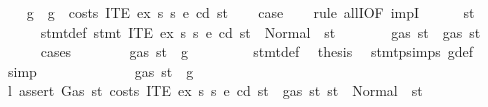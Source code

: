 \begin{isabellebody}
\ \ \isamarkupfalse%
\ g\ \ {\isachardoublequoteopen}g\ {\isacharequal}{\kern0pt}\ costs\ {\isacharparenleft}{\kern0pt}ITE\ ex\ s{}\ s{}{\isacharparenright}{\kern0pt}\ e\ cd\ st{\isachardoublequoteclose}\isanewline
\ \ \isamarkupfalse%
\ {\isacharquery}{\kern0pt}case\isanewline
\ \ \isamarkupfalse%
\ {\isacharparenleft}{\kern0pt}rule\ allI{\isacharbrackleft}{\kern0pt}OF\ impI{\isacharbrackright}{\kern0pt}{\isacharparenright}{\kern0pt}\isanewline
\ \ \ \ \isamarkupfalse%
\ st{}{\isacharprime}{\kern0pt}\isanewline
\ \ \ \ \isamarkupfalse%
\ stmt{\isacharunderscore}{\kern0pt}def{\isacharcolon}{\kern0pt}\ {\isachardoublequoteopen}stmt\ {\isacharparenleft}{\kern0pt}ITE\ ex\ s{}\ s{}{\isacharparenright}{\kern0pt}\ e\ cd\ st\ {\isacharequal}{\kern0pt}\ Normal\ {\isacharparenleft}{\kern0pt}{\isacharparenleft}{\kern0pt}{\isacharparenright}{\kern0pt}{\isacharcomma}{\kern0pt}\ st{}{\isacharprime}{\kern0pt}{\isacharparenright}{\kern0pt}{\isachardoublequoteclose}\isanewline
\ \ \ \ \isamarkupfalse%
\ \isamarkupfalse%
\ {\isachardoublequoteopen}gas\ st{}{\isacharprime}{\kern0pt}\ {\isasymle}\ gas\ st{\isachardoublequoteclose}\isanewline
\ \ \ \ \isamarkupfalse%
\ cases\isanewline
\ \ \ \ \ \ \isamarkupfalse%
\ {\isachardoublequoteopen}gas\ st\ {\isasymle}\ g{\isachardoublequoteclose}\isanewline
\ \ \ \ \ \ \isamarkupfalse%
\ {}{\isacharparenleft}{\kern0pt}{}{\isacharparenright}{\kern0pt}\ stmt{\isacharunderscore}{\kern0pt}def\ \isamarkupfalse%
\ {\isacharquery}{\kern0pt}thesis\ \isamarkupfalse%
\ stmt{\isachardot}{\kern0pt}psimps{\isacharparenleft}{\kern0pt}{}{\isacharparenright}{\kern0pt}\ g{\isacharunderscore}{\kern0pt}def\ \isamarkupfalse%
\ simp\isanewline
\ \ \ \ \isamarkupfalse%
\isanewline
\ \ \ \ \ \ \isamarkupfalse%
\ {\isachardoublequoteopen}{\isasymnot}\ gas\ st\ {\isasymle}\ g{\isachardoublequoteclose}\isanewline
\ \ \ \ \ \ \isamarkupfalse%
\ \isamarkupfalse%
\ l{}{\isacharcolon}{\kern0pt}\ {\isachardoublequoteopen}assert\ Gas\ {\isacharparenleft}{\kern0pt}{\isasymlambda}st{\isachardot}{\kern0pt}\ costs\ {\isacharparenleft}{\kern0pt}ITE\ ex\ s{}\ s{}{\isacharparenright}{\kern0pt}\ e\ cd\ st\ {\isacharless}{\kern0pt}\ gas\ st{\isacharparenright}{\kern0pt}\ st\ {\isacharequal}{\kern0pt}\ Normal\ {\isacharparenleft}{\kern0pt}{\isacharparenleft}{\kern0pt}{\isacharparenright}{\kern0pt}{\isacharcomma}{\kern0pt}\ st{\isacharparenright}{\kern0pt}\ {\isachardoublequoteclose}\ \isamarkupfalse%

\end{isabellebody}
